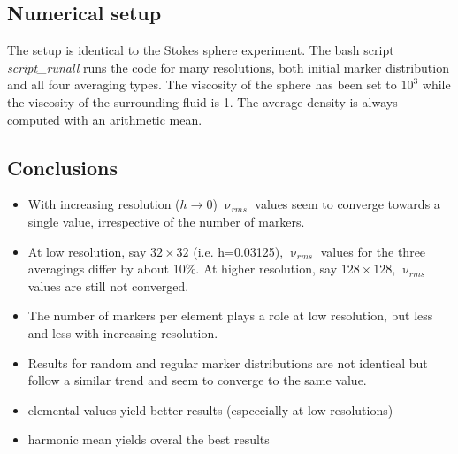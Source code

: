 \subsection*{Numerical setup}

The setup is identical to the Stokes sphere experiment. The bash script {\sl script\_runall} 
runs the code for many resolutions, both initial marker distribution and all four 
averaging types. The viscosity of the sphere has been 
set to $10^3$ while the viscosity of the surrounding fluid is 1. 
The average density is always computed with an arithmetic mean. 


\subsection*{Conclusions}

\begin{itemize}
\item
With increasing resolution ($h\rightarrow 0$) $\upnu_{rms}$ 
values seem to converge towards a single value, irrespective 
of the number of markers. 

\item
At low resolution, say $32\times 32$ (i.e. h=0.03125), $\upnu_{rms}$ 
values for the three averagings differ by about 10\%. 
At higher resolution, say $128\times 128$, $\upnu_{rms}$ 
values are still not converged.  

\item
The number of markers per element plays a role at low resolution, 
but less and less with increasing resolution. 

\item
Results for random and regular marker distributions are not 
identical but follow a similar trend and seem to converge to 
the same value.

\item  elemental values yield better results (espcecially at low resolutions)

\item harmonic mean yields overal the best results
\end{itemize}

